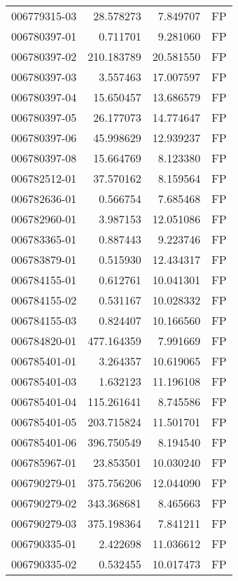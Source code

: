 \begin{tabular}{lrrl}
006779315-03 &   28.578273 &       7.849707 &   FP \\
006780397-01 &    0.711701 &       9.281060 &   FP \\
006780397-02 &  210.183789 &      20.581550 &   FP \\
006780397-03 &    3.557463 &      17.007597 &   FP \\
006780397-04 &   15.650457 &      13.686579 &   FP \\
006780397-05 &   26.177073 &      14.774647 &   FP \\
006780397-06 &   45.998629 &      12.939237 &   FP \\
006780397-08 &   15.664769 &       8.123380 &   FP \\
006782512-01 &   37.570162 &       8.159564 &   FP \\
006782636-01 &    0.566754 &       7.685468 &   FP \\
006782960-01 &    3.987153 &      12.051086 &   FP \\
006783365-01 &    0.887443 &       9.223746 &   FP \\
006783879-01 &    0.515930 &      12.434317 &   FP \\
006784155-01 &    0.612761 &      10.041301 &   FP \\
006784155-02 &    0.531167 &      10.028332 &   FP \\
006784155-03 &    0.824407 &      10.166560 &   FP \\
006784820-01 &  477.164359 &       7.991669 &   FP \\
006785401-01 &    3.264357 &      10.619065 &   FP \\
006785401-03 &    1.632123 &      11.196108 &   FP \\
006785401-04 &  115.261641 &       8.745586 &   FP \\
006785401-05 &  203.715824 &      11.501701 &   FP \\
006785401-06 &  396.750549 &       8.194540 &   FP \\
006785967-01 &   23.853501 &      10.030240 &   FP \\
006790279-01 &  375.756206 &      12.044090 &   FP \\
006790279-02 &  343.368681 &       8.465663 &   FP \\
006790279-03 &  375.198364 &       7.841211 &   FP \\
006790335-01 &    2.422698 &      11.036612 &   FP \\
006790335-02 &    0.532455 &      10.017473 &   FP \\

\end{tabular}
